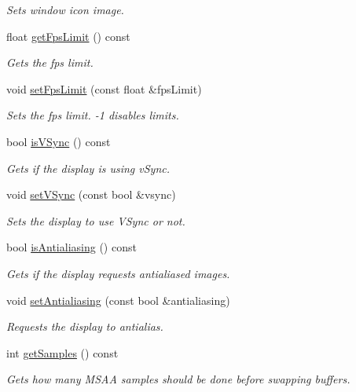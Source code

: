 \begin{DoxyCompactItemize}
\begin{DoxyCompactList}\small\item\em Sets window icon image. \end{DoxyCompactList}\item 
float \hyperlink{classflounder_1_1display_a2b18a6a0f62f5a265b390cac5cc923a3}{get\+Fps\+Limit} () const
\begin{DoxyCompactList}\small\item\em Gets the fps limit. \end{DoxyCompactList}\item 
void \hyperlink{classflounder_1_1display_acdcc3dce1dba837c5abde1b51004725a}{set\+Fps\+Limit} (const float \&fps\+Limit)
\begin{DoxyCompactList}\small\item\em Sets the fps limit. -\/1 disables limits. \end{DoxyCompactList}\item 
bool \hyperlink{classflounder_1_1display_a856cee2cfd9d3640134001ab81585701}{is\+V\+Sync} () const
\begin{DoxyCompactList}\small\item\em Gets if the display is using v\+Sync. \end{DoxyCompactList}\item 
void \hyperlink{classflounder_1_1display_a172501e1e99cde228d86fab59a3a636b}{set\+V\+Sync} (const bool \&vsync)
\begin{DoxyCompactList}\small\item\em Sets the display to use V\+Sync or not. \end{DoxyCompactList}\item 
bool \hyperlink{classflounder_1_1display_a79fd9d5571bb4bcd119240b8f919c491}{is\+Antialiasing} () const
\begin{DoxyCompactList}\small\item\em Gets if the display requests antialiased images. \end{DoxyCompactList}\item 
void \hyperlink{classflounder_1_1display_ae9a340bfa09dfd6d08ebc0d21b4c77b0}{set\+Antialiasing} (const bool \&antialiasing)
\begin{DoxyCompactList}\small\item\em Requests the display to antialias. \end{DoxyCompactList}\item 
int \hyperlink{classflounder_1_1display_ad3fe2fe2d8610010e53ec11a272c537c}{get\+Samples} () const
\begin{DoxyCompactList}\small\item\em Gets how many M\+S\+AA samples should be done before swapping buffers. \end{DoxyCompactList}\item 

\end{DoxyCompactItemize}

